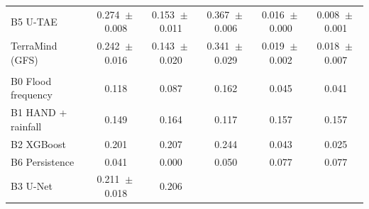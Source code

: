 \begin{tabular}{lccccc}
\\
B5 U-TAE
& 0.274%
${}\pm{}$0.008%
& 0.153%
${}\pm{}$0.011%
& 0.367%
${}\pm{}$0.006%
& 0.016%
${}\pm{}$0.000%
& 0.008%
${}\pm{}$0.001%
\\
TerraMind (GFS)
& 0.242%
${}\pm{}$0.016%
& 0.143%
${}\pm{}$0.020%
& 0.341%
${}\pm{}$0.029%
& 0.019%
${}\pm{}$0.002%
& 0.018%
${}\pm{}$0.007%
\\
\addlinespace
\multicolumn{6}{l}{\textit{Test B}} \\
B0 Flood frequency
& 0.118%
& 0.087%
& 0.162%
& 0.045%
& 0.041%
\\
B1 HAND + rainfall
& 0.149%
& 0.164%
& 0.117%
& 0.157%
& 0.157%
\\
B2 XGBoost
& 0.201%
& 0.207%
& 0.244%
& 0.043%
& 0.025%
\\
B6 Persistence
& 0.041%
& 0.000%
& 0.050%
& 0.077%
& 0.077%
\\
B3 U-Net
& 0.211%
${}\pm{}$0.018%
& 0.206%

\end{tabular}
